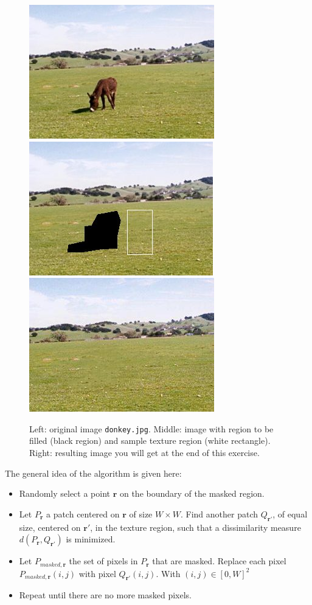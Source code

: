 \documentclass[12pt]{article}
\begin{document}
\begin{figure}[h]
\centering
\includegraphics[width=.31\textwidth]{donkey}
\includegraphics[width=.31\textwidth]{donkey2}
\includegraphics[width=.31\textwidth]{donkey3}
\caption{Left: original image  \texttt{donkey.jpg}. Middle: image with region to be filled (black region) and sample texture region (white rectangle). Right: resulting image you will get at the end of this exercise.}
\label{fig:donkey}
\end{figure}

The general idea of the algorithm is given here:
\begin{itemize}
  \item Randomly select a point $\bm{r}$ on the boundary of the masked region.
  \item Let $P_{\bm{r}}$ a patch centered on $\bm{r}$ of size $W \times W$. Find another patch $Q_{\bm{r}'}$, of equal size, centered on $\bm{r}'$, in the texture region, such that a dissimilarity measure $d(P_{\bm{r}},Q_{\bm{r}'})$ is minimized.
  \item Let $P_{masked, \bm{r}}$ the set of pixels in $P_{\bm{r}}$ that are masked.
    Replace each pixel $P_{masked, \bm{r}}(i, j)$  with pixel  $Q_{\bm{r}'}(i, j)$. With $(i, j) \in [0, W]^2$
  \item Repeat until there are no more masked pixels.
\end{itemize}
\end{document}
